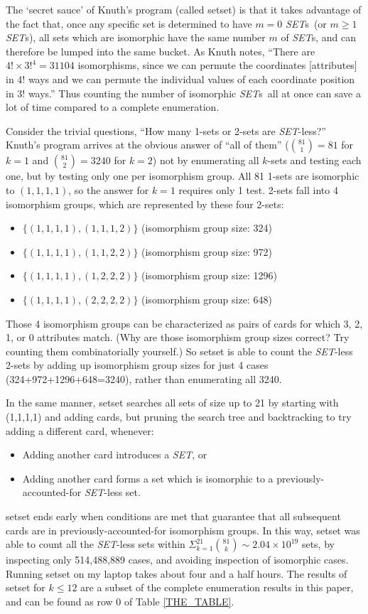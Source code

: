 \documentclass{article}
\newcommand{\SET}{{\em SET}}
\newcommand{\SETs}{{\em SET}s}
\newcommand{\SETSET}{{\sc setset}}
\newcommand{\SETSETb}{{\sc setset }}
\begin{document}
The `secret sauce' of Knuth's program (called \SETSET) is that it takes
advantage of the fact that, once any specific set is determined to have $m=0$
\SETs~(or $m\geq 1$ \SETs), all sets which are isomorphic have the same number
$m$ of \SETs, and can therefore be lumped into the same bucket. As Knuth notes,
``There are $4! \times 3!^4 = 31104$ isomorphisms, since we can permute the
coordinates [attributes] in 4! ways and we can permute the individual values of
each coordinate position in 3! ways.''  Thus counting the number of isomorphic
\SETs~all at once can save a lot of time compared to a complete enumeration.

Consider the trivial questions, ``How many 1-sets or 2-sets are \SET-less?''
Knuth's program arrives at the obvious answer of ``all of them''
($\binom{81}{1}=81$ for $k=1$ and $\binom{81}{2}=3240$ for $k=2$) not by
enumerating all $k$-sets and testing each one, but by testing only one per
isomorphism group. All 81 1-sets are isomorphic to ${(1,1,1,1)}$, so the answer
for $k=1$ requires only 1 test. 2-sets fall into 4 isomorphism groups, which are
represented by these four 2-sets:
\begin{itemize}
\item $\{(1,1,1,1), (1,1,1,2)\}$ (isomorphism group size: 324)
\item $\{(1,1,1,1), (1,1,2,2)\}$ (isomorphism group size: 972)
\item $\{(1,1,1,1), (1,2,2,2)\}$ (isomorphism group size: 1296)
\item $\{(1,1,1,1), (2,2,2,2)\}$ (isomorphism group size: 648)
\end{itemize}
Those 4 isomorphism groups can be characterized as pairs of cards for which 3,
2, 1, or 0 attributes match. (Why are those isomorphism group sizes correct? Try
counting them combinatorially yourself.) So \SETSETb is able to count the
\SET-less 2-sets by adding up isomorphism group sizes for just 4 cases
(324+972+1296+648=3240), rather than enumerating all 3240.

In the same manner, \SETSETb searches all sets of size up to 21 by starting with
(1,1,1,1) and adding cards, but pruning the search tree and backtracking to try
adding a different card, whenever:
\begin{itemize}
\item Adding another card introduces a \SET, or
\item Adding another card forms a set which is isomorphic to a
  previously-accounted-for \SET-less set.
\end{itemize}
\SETSETb ends early when conditions are met that guarantee that all subsequent
cards are in previously-accounted-for isomorphism groups. In this way, \SETSETb
was able to count all the \SET-less sets within
$\Sigma_{k=1}^{21}\binom{81}{k}\sim 2.04\times 10^{19}$ sets, by inspecting only
514,488,889 cases, and avoiding inspection of isomorphic cases. Running \SETSETb
on my laptop takes about four and a half hours. The results of \SETSETb for
$k\leq 12$ are a subset of the complete enumeration results in this paper, and
can be found as row 0 of Table \ref{THE_TABLE}.
\end{document}
